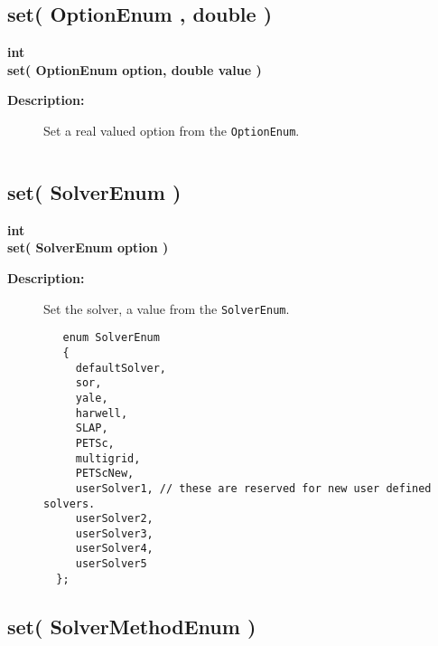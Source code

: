 \subsection{set( OptionEnum , double )}
 
\begin{flushleft} \textbf{%
int  \\ 
\settowidth{\OgesParametersIncludeArgIndent}{set(}%
set( OptionEnum option, double value )
}\end{flushleft}
\begin{description}
\item[{\bf Description:}] 
    Set a real valued option from the {\tt OptionEnum}.
 \begin{verbatim}
 \end{verbatim}
\end{description}
\subsection{set( SolverEnum )}
 
\begin{flushleft} \textbf{%
int  \\ 
\settowidth{\OgesParametersIncludeArgIndent}{set(}%
set( SolverEnum option )
}\end{flushleft}
\begin{description}
\item[{\bf Description:}] 
   Set the solver, a value from the {\tt SolverEnum}.
 \begin{verbatim}
   enum SolverEnum
   {
     defaultSolver,
     sor,
     yale,
     harwell,
     SLAP,
     PETSc,
     multigrid,
     PETScNew,
     userSolver1, // these are reserved for new user defined solvers.
     userSolver2,
     userSolver3,
     userSolver4,
     userSolver5
  };
 \end{verbatim}
\end{description}
\subsection{set( SolverMethodEnum  )}
 
